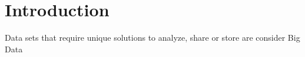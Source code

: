 

\section{Introduction}

\begin{frame}
		
		Data sets that require unique solutions to analyze, share or store are
		consider Big Data

\end{frame}

